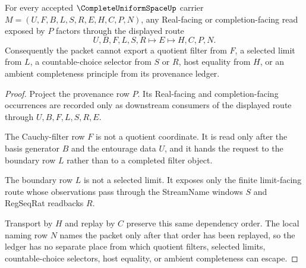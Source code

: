 \begin{theorem}
\label{thm:complete-uniform-space-ledger-non-escape}
For every accepted $\CompleteUniformSpaceUp$ carrier $M=(U,F,B,L,S,R,E,H,C,P,N)$, any Real-facing or completion-facing read exposed by $P$ factors through the displayed route
$$
U,B,F,L,S,R \longmapsto E \longmapsto H,C,P,N .
$$
Consequently the packet cannot export a quotient filter from $F$, a selected limit from $L$, a countable-choice selector from $S$ or $R$, host equality from $H$, or an ambient completeness principle from its provenance ledger.
\end{theorem}
\begin{proof}
Project the provenance row $P$. Its Real-facing and completion-facing occurrences are recorded only as downstream consumers of the displayed route through $U,B,F,L,S,R,E$.

The Cauchy-filter row $F$ is not a quotient coordinate. It is read only after the basis generator $B$ and the entourage data $U$, and it hands the request to the boundary row $L$ rather than to a completed filter object.

The boundary row $L$ is not a selected limit. It exposes only the finite limit-facing route whose observations pass through the StreamName windows $S$ and RegSeqRat readbacks $R$.

Transport by $H$ and replay by $C$ preserve this same dependency order. The local naming row $N$ names the packet only after that order has been replayed, so the ledger has no separate place from which quotient filters, selected limits, countable-choice selectors, host equality, or ambient completeness can escape.
\end{proof}

\begin{closurestatus}{\CompleteUniformSpaceUp}
  \theoryclosure{\seedClosure}
  \formalstatus{\unformalizedV}
\end{closurestatus}
